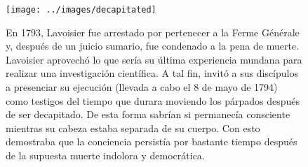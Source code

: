 \begin{warncard}[size=small]%
    \begin{figure}[H]
        \centering
        \texttt{[image: ../images/decapitated]}
        \caption{En 1793, Lavoisier fue arrestado por pertenecer a la Ferme Générale y, después de un juicio sumario, fue condenado a la pena de muerte. Lavoisier aprovechó lo que sería su última experiencia mundana para realizar una investigación científica. A tal fin, invitó a sus discípulos a presenciar su ejecución (llevada a cabo el 8 de mayo de 1794) como testigos del tiempo que durara moviendo los párpados después de ser decapitado. De esta forma sabrían si permanecía consciente mientras su cabeza estaba separada de su cuerpo. Con esto demostraba que la conciencia persistía por bastante tiempo después de la supuesta muerte indolora y democrática.}
        \label{fig:decapitated}
    \end{figure}
\end{warncard}